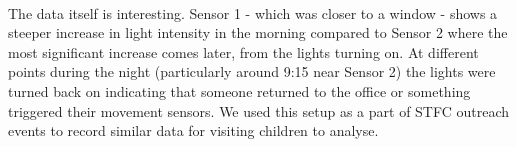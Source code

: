 \paragraph{}
The data itself is interesting. Sensor 1 - which was closer to a window - shows a steeper increase in light intensity in the morning compared to Sensor 2 where the most significant increase comes later, from the lights turning on. At different points during the night (particularly around 9:15 near Sensor 2) the lights were turned back on indicating that someone returned to the office or something triggered their movement sensors. We used this setup as a part of STFC outreach events to record similar data for visiting children to analyse.

